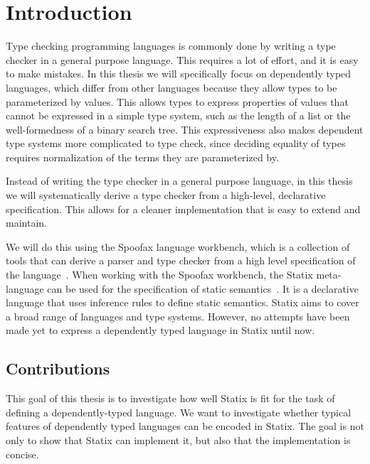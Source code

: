 \chapter{Introduction}

Type checking programming languages is commonly done by writing a type checker in a general purpose language. This requires a lot of effort, and it is easy to make mistakes. In this thesis we will specifically focus on dependently typed languages, which differ from other languages because they allow types to be parameterized by values. This allows types to express properties of values that cannot be expressed in a simple type system, such as the length of a list or the well-formedness of a binary search tree. This expressiveness also makes dependent type systems more complicated to type check, since deciding equality of types requires normalization of the terms they are parameterized by. 

Instead of writing the type checker in a general purpose language, in this thesis we will systematically derive a type checker from a high-level, declarative specification. This allows for a cleaner implementation that is easy to extend and maintain.

We will do this using the Spoofax language workbench, which is a collection of tools that can derive a parser and type checker from a high level specification of the language~\cite{spoofax}. When working with the Spoofax workbench, the Statix meta-language can be used for the specification of static semantics~\cite{scopes_as_types}. It is a declarative language that uses inference rules to define static semantics. Statix aims to cover a broad range of languages and type systems. However, no attempts have been made yet to express a dependently typed language in Statix until now. 

\section*{Contributions}
This goal of this thesis is to investigate how well Statix is fit for the task of defining a dependently-typed language. We want to investigate whether typical features of dependently typed languages can be encoded in Statix. The goal is not only to show that Statix can implement it, but also that the implementation is concise.

